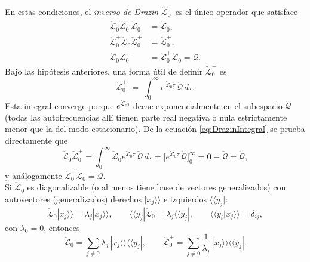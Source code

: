 \begin{appendixs}
En estas condiciones, el \emph{inverso de Drazin} $\check{\mathcal{L}}_{0}^{+}$ es el único operador que satisface
\begin{align*}
    \check{\mathcal{L}}_{0}\check{\mathcal{L}}_{0}^{+}\check{\mathcal{L}}_{0} &= \check{\mathcal{L}}_{0},\\
    \check{\mathcal{L}}_{0}^{+}\check{\mathcal{L}}_{0}\check{\mathcal{L}}_{0}^{+} &= \check{\mathcal{L}}_{0}^{+},\\
    \check{\mathcal{L}}_{0}\check{\mathcal{L}}_{0}^{+} &= \check{\mathcal{L}}_{0}^{+}\check{\mathcal{L}}_{0} = \check{\mathcal{Q}}.
\end{align*}
Bajo las hipótesis anteriores, una forma útil  de definir
$\check{\mathcal{L}}_{0}^{+}$ es
\begin{equation}
    \check{\mathcal{L}}_{0}^{+} \;=\; \int_{0}^{\infty} e^{\,\check{\mathcal{L}}_{0}\tau}\,\check{\mathcal{Q}}\, d\tau .
    \label{eq:DrazinIntegral}
\end{equation}
Esta integral converge porque $e^{\check{\mathcal{L}}_{0}\tau}$ decae exponencialmente en el
subespacio $\check{\mathcal{Q}}$ (todas las autofrecuencias allí tienen parte real negativa o nula
estrictamente menor que la del modo estacionario). De la ecuación \eqref{eq:DrazinIntegral} se prueba directamente que
\[
\check{\mathcal{L}}_{0}\check{\mathcal{L}}_{0}^{+}
= \int_{0}^{\infty} \check{\mathcal{L}}_{0} e^{\check{\mathcal{L}}_{0}\tau}\,\check{\mathcal{Q}}\, d\tau
= \Big[ e^{\check{\mathcal{L}}_{0}\tau}\,\check{\mathcal{Q}}\Big]_{0}^{\infty}
= \mathbf{0}-\check{\mathcal{Q}} = \check{\mathcal{Q}},
\]
y análogamente $\check{\mathcal{L}}_{0}^{+}\check{\mathcal{L}}_{0}=\check{\mathcal{Q}}$.
\\

Si $\check{\mathcal{L}}_{0}$ es diagonalizable (o al menos tiene base de vectores generalizados) con
autovectores (generalizados) derechos $|x_{j}\rangle\rangle$ e izquierdos $\langle\langle y_{j}|$:
\[
\check{\mathcal{L}}_{0}|x_{j}\rangle\rangle=\lambda_{j}|x_{j}\rangle\rangle,\qquad
\langle\langle y_{j}|\check{\mathcal{L}}_{0}=\lambda_{j}\langle\langle y_{j}|,\qquad
\langle\langle y_{i}|x_{j}\rangle\rangle=\delta_{ij},
\]
con $\lambda_{0}=0$, entonces
\begin{equation*}
    \check{\mathcal{L}}_{0}
    = \sum_{j\neq 0}\lambda_{j}\,|x_{j}\rangle\rangle\langle\langle y_{j}|, \qquad
    \check{\mathcal{L}}_{0}^{+}
    = \sum_{j\neq 0}\frac{1}{\lambda_{j}}\,|x_{j}\rangle\rangle\langle\langle y_{j}|.
\end{equation*}


\end{appendixs}
